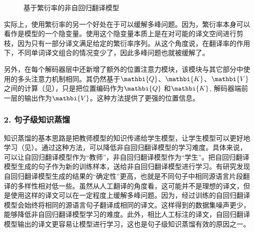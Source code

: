 \begin{figure}[htp]
\centering
 
\caption{基于繁衍率的非自回归翻译模型}
\label{fig:14-14}
\end{figure}

\parinterval 实际上，使用繁衍率的另一个好处在于可以缓解多峰问题。因为，繁衍率本身可以看作是模型的一个隐变量。使用这个隐变量本质上是在对可能的译文空间进行剪枝，因为只有一部分译文满足给定的繁衍率序列。从这个角度说，在翻译率的作用下，不同单词译文组合的情况变少了，因此多峰问题也就被缓解了。

\parinterval 另外，在每个解码器层中还新增了额外的位置注意力模块，该模块与其它部分中使用的多头注意力机制相同。其仍然基于$\mathbi{Q}$、$\mathbi{K}$、$\mathbi{V}$之间的计算（见{\chaptertwelve}），只是把位置编码作为$\mathbi{Q}$ 和$\mathbi{K}$, 解码器端前一层的输出作为$\mathbi{V}$。这种方法提供了更强的位置信息。


\subsubsection{2. 句子级知识蒸馏}

\parinterval 知识蒸馏的基本思路是把教师模型的知识传递给学生模型，让学生模型可以更好地学习（见\chapterthirteen）。通过这种方法，可以降低非自回归翻译模型的学习难度。具体来说，可以让自回归翻译模型作为“教师”，非自回归翻译模型作为“学生”。把自回归翻译模型生成的句子作为新的训练样本，送给非自回归翻译模型进行学习。有研究发现自回归翻译模型生成的结果的“确定性”更高，也就是不同句子中相同源语言片段翻译的多样性相对低一些。虽然从人工翻译的角度看，这可能并不是理想的译文，但是使用这样的译文可以在一定程度上缓解多峰问题。因为，经过训练的自回归翻译模型会始终将相同的源语言句子翻译成相同的译文。这样得到的数据集噪声更少，能够降低非自回归翻译模型学习的难度。此外，相比人工标注的译文，自回归翻译模型输出的译文更容易让模型进行学习，这也是句子级知识蒸馏有效的原因之一。


